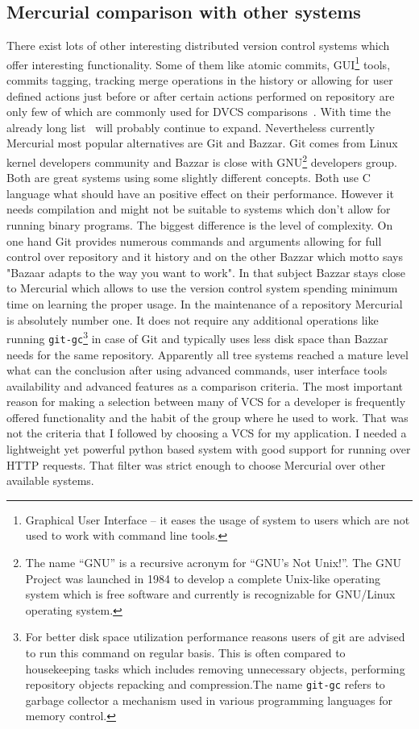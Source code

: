 \subsection{Mercurial comparison with other systems}\label{subsec:dvcs_compare}
There exist lots of other interesting distributed version control systems which offer interesting functionality. Some of them like atomic commits, GUI\footnote{Graphical User Interface -- it eases the usage of system to users which are not used to work with command line tools.} tools, commits tagging, tracking merge operations in the history or allowing for user defined actions just before or after certain actions performed on repository are only few of which are commonly used for DVCS comparisons~\cite{wiki_dvcs_compare}. With time the already long list~\cite{wiki_dvcs_list} will probably continue to expand. Nevertheless currently Mercurial most popular alternatives are Git and Bazzar. Git comes from Linux kernel developers community and Bazzar is close with GNU\footnote{The name “GNU” is a recursive acronym for “GNU's Not Unix!”. The GNU Project was launched in 1984 to develop a complete Unix-like operating system which is free software and currently is recognizable for GNU/Linux operating system.} developers group. Both are great systems using some slightly different concepts. Both use C language what should have an positive effect on their performance. However it needs compilation and might not be suitable to systems which don't allow for running binary programs. The biggest difference is the level of complexity. On one hand Git provides numerous commands and arguments allowing for full control over repository and it history and on the other Bazzar which motto says "Bazaar adapts to the way you want to work". In that subject Bazzar stays close to Mercurial which allows to use the version control system spending minimum time on learning the proper usage. In the maintenance of a repository Mercurial is absolutely number one. It does not require any additional operations like running \texttt{git-gc}\footnote{For better disk space utilization performance reasons users of git are advised to run this command on regular basis. This is often compared to housekeeping tasks which includes removing unnecessary objects, performing repository objects repacking and compression.The name \texttt{git-gc} refers to garbage collector a mechanism used in various programming languages for memory control.} in case of Git and typically uses less disk space than Bazzar needs for the same repository. Apparently all tree systems reached a mature level what can the conclusion after using advanced commands, user interface tools availability and  advanced features as a comparison criteria. The most important reason for making a selection between many of VCS for a developer is frequently offered functionality and the habit of the group where he used to work. That was not the criteria that I followed by choosing a VCS for my application. I needed a lightweight yet powerful python based system with good support for running over HTTP requests. That filter was strict enough to choose Mercurial over other available systems.     

